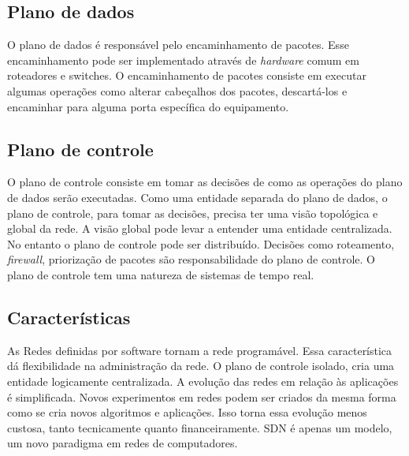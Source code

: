 \subsection{Plano de dados}

O plano de dados é responsável pelo encaminhamento de pacotes. 
Esse encaminhamento pode ser implementado através de \emph{hardware} 
comum em roteadores e switches. 
O encaminhamento de pacotes consiste em executar algumas operações 
como alterar cabeçalhos dos pacotes, descartá-los e encaminhar para alguma 
porta específica do equipamento.

\subsection{Plano de controle}

O plano de controle consiste em tomar as decisões de como as operações do 
plano de dados serão executadas.
Como uma entidade separada do plano de dados, o plano de controle, para 
tomar as decisões, precisa ter uma visão topológica e global da rede. 
A visão global pode levar a entender uma entidade centralizada. 
No entanto o plano de controle pode ser distribuído. 
Decisões como roteamento, \emph{firewall}, priorização de pacotes são 
responsabilidade do plano de controle.
O plano de controle tem uma natureza de sistemas de tempo real.

\subsection{Características}

As Redes definidas por software tornam a rede programável.
Essa característica dá flexibilidade na administração da rede.
O plano de controle isolado, cria uma entidade logicamente centralizada.
A evolução das redes em relação às aplicações é simplificada. 
Novos experimentos em redes podem ser criados da mesma forma como se cria 
novos algoritmos e aplicações.
Isso torna essa evolução menos custosa, tanto tecnicamente 
quanto financeiramente.
SDN é apenas um modelo, um novo paradigma em redes de computadores.
